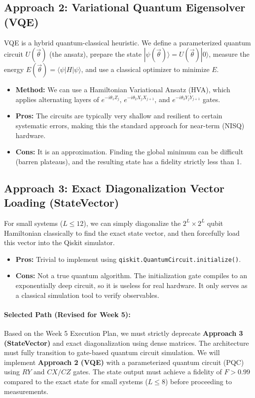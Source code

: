 \documentclass[11pt]{article}
\newcommand{\ket}[1]{|#1\rangle}
\newcommand{\bra}[1]{\langle#1|}
\begin{document}
\subsection{Approach 2: Variational Quantum Eigensolver (VQE)}
VQE is a hybrid quantum-classical heuristic. We define a parameterized quantum circuit $U(\vec{\theta})$ (the ansatz), prepare the state $\ket{\psi(\vec{\theta})} = U(\vec{\theta})\ket{0}$, measure the energy $E(\vec{\theta}) = \bra{\psi} H \ket{\psi}$, and use a classical optimizer to minimize $E$.
\begin{itemize}
  \item \textbf{Method:} We can use a Hamiltonian Variational Ansatz (HVA), which applies alternating layers of $e^{-i \theta_1 Z_j}$, $e^{-i \theta_2 X_j X_{j+1}}$, and $e^{-i \theta_3 Y_j Y_{j+1}}$ gates.
  \item \textbf{Pros:} The circuits are typically very shallow and resilient to certain systematic errors, making this the standard approach for near-term (NISQ) hardware.
  \item \textbf{Cons:} It is an approximation. Finding the global minimum can be difficult (barren plateaus), and the resulting state has a fidelity strictly less than 1.
\end{itemize}

\subsection{Approach 3: Exact Diagonalization Vector Loading (StateVector)}
For small systems ($L \le 12$), we can simply diagonalize the $2^L \times 2^L$ qubit Hamiltonian classically to find the exact state vector, and then forcefully load this vector into the Qiskit simulator.
\begin{itemize}
  \item \textbf{Pros:} Trivial to implement using \texttt{qiskit.QuantumCircuit.initialize()}.
  \item \textbf{Cons:} Not a true quantum algorithm. The initialization gate compiles to an exponentially deep circuit, so it is useless for real hardware. It only serves as a classical simulation tool to verify observables.
\end{itemize}

\paragraph{Selected Path (Revised for Week 5):} Based on the Week 5 Execution Plan, we must strictly deprecate \textbf{Approach 3 (StateVector)} and exact diagonalization using dense matrices. The architecture must fully transition to gate-based quantum circuit simulation. We will implement \textbf{Approach 2 (VQE)} with a parameterized quantum circuit (PQC) using $RY$ and $CX/CZ$ gates. The state output must achieve a fidelity of $F > 0.99$ compared to the exact state for small systems ($L \le 8$) before proceeding to measurements.
\end{document}

